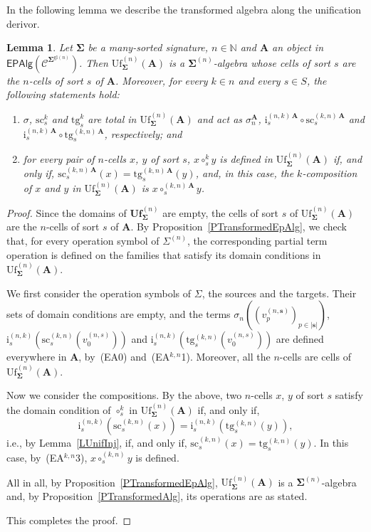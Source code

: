 \documentclass[a4paper, reqno
]{amsart}
\newcommand{\bb}[1]{\ensuremath{\lvert #1 \rvert}}
\newcommand{\sig}[1]{\mathbf{#1}}             %
\newcommand{\spec}[1]{\boldsymbol{\mathcal{#1}}} %
\newcommand{\gl}{\mathrm{gl}}                %
\newcommand{\src}{\mathrm{sc}}
\newcommand{\tgt}{\mathrm{tg}}
\newcommand{\Uf}{\mathrm{Uf}}
\newcommand{\bUf}{\mathbf{Uf}}
\theoremstyle{plain}
\newtheorem{lemma}[theorem]{Lemma}
\theoremstyle{definition}
\begin{document}
In the following lemma we describe the transformed algebra along the unification derivor.

\begin{lemma}\label{LUnifDescription}
Let $\sig{\Sigma}$ be a many-sorted signature, $n\in\mathbb{N}$ and $\mathbf{A}$ an object in $\mathsf{EPAlg}(\spec{C}^{\sig{\Sigma}^{\gl(n)}})$.
Then $\Uf^{(n)}_{\sig{\Sigma}}(\mathbf{A})$ is a $\sig{\Sigma}^{(n)}$-algebra whose cells of sort $s$ are the $n$-cells of sort $s$ of $\mathbf{A}$.
Moreover, for every $k\in n$ and every $s\in S$, the following statements hold:
\begin{enumerate}
\item $\sigma$, $\src^{k}_{s}$ and $\tgt^{k}_{s}$ are total in $\Uf^{(n)}_{\sig{\Sigma}}(\mathbf{A})$ and act as $\sigma^{\mathbf{A}}_{n}$, $\mathrm{i}^{(n,k)\,\mathbf{A}}_{s}\circ\src^{(k,n)\,\mathbf{A}}_{s}$ and $\mathrm{i}^{(n,k)\,\mathbf{A}}_{s}\circ\tgt^{(k,n)\,\mathbf{A}}_{s}$, respectively; and
\item for every pair of $n$-cells $x$, $y$ of sort $s$, $x\circ^{k}_{s}y$ is defined in $\Uf^{(n)}_{\sig{\Sigma}}(\mathbf{A})$ if, and only if, $\src^{(k,n)\,\mathbf{A}}_{s}(x)=\tgt^{(k,n)\,\mathbf{A}}_{s}(y)$, and, in this case, the $k$-composition of $x$ and $y$ in $\Uf^{(n)}_{\sig{\Sigma}}(\mathbf{A})$ is $x\circ^{(k,n)\,\mathbf{A}}_{s}y$.
\end{enumerate}
\end{lemma}
\begin{proof}
Since the domains of $\bUf^{(n)}_{\sig{\Sigma}}$ are empty, the cells of sort $s$ of $\Uf^{(n)}_{\sig{\Sigma}}(\mathbf{A})$ are the $n$-cells of sort $s$ of $\mathbf{A}$.
By Proposition~\ref{PTransformedEpAlg}, we check that, for every operation symbol of $\Sigma^{(n)}$, the corresponding partial term operation is defined on the families that satisfy its domain conditions in $\Uf^{(n)}_{\sig{\Sigma}}(\mathbf{A})$.

We first consider the operation symbols of $\Sigma$, the sources and the targets.
Their sets of domain conditions are empty, and the terms $\sigma_{n}((v^{(n,\mathbf{s})}_{p})_{p\in\bb{\mathbf{s}}})$, $\mathrm{i}^{(n,k)}_{s}(\src^{(k,n)}_{s}(v^{(n,s)}_{0}))$ and $\mathrm{i}^{(n,k)}_{s}(\tgt^{(k,n)}_{s}(v^{(n,s)}_{0}))$ are defined everywhere in $\mathbf{A}$, by~(EA0) and~(EA$^{k,n}$1).
Moreover, all the $n$-cells are cells of $\Uf^{(n)}_{\sig{\Sigma}}(\mathbf{A})$.

Now we consider the compositions.
By the above, two $n$-cells $x$, $y$ of sort $s$ satisfy the domain condition of $\circ^{k}_{s}$ in $\Uf^{(n)}_{\sig{\Sigma}}(\mathbf{A})$ if, and only if,
$$
\mathrm{i}^{(n,k)}_{s}\left(\src^{(k,n)}_{s}(x)\right)=\mathrm{i}^{(n,k)}_{s}\left(\tgt^{(k,n)}_{s}(y)\right),
$$
i.e., by Lemma~\ref{LUnifInj}, if, and only if, $\src^{(k,n)}_{s}(x)=\tgt^{(k,n)}_{s}(y)$.
In this case, by~(EA$^{k,n}$3), $x\circ^{(k,n)}_{s}y$ is defined.

All in all, by Proposition~\ref{PTransformedEpAlg}, $\Uf^{(n)}_{\sig{\Sigma}}(\mathbf{A})$ is a $\sig{\Sigma}^{(n)}$-algebra and, by Proposition~\ref{PTransformedAlg}, its operations are as stated.

This completes the proof.
\end{proof}
\end{document}
